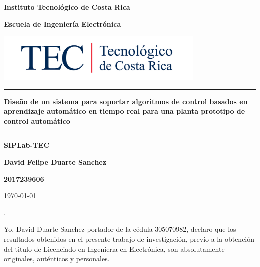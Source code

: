 \documentclass[12pt]{article}
\begin{document}
\begin{titlepage}

\centering


\vspace{10cm}

\textbf{\LARGE Instituto Tecnológico de Costa Rica}

\vspace{2cm}

\textbf{\LARGE Escuela de Ingeniería Electrónica}

\vspace{2cm}

\includegraphics[width=10cm]{logotec/image.png}
\vspace{2cm}

\hrule

\vspace{1cm}

\textbf{\LARGE Diseño de un sistema para soportar algoritmos de control basados en aprendizaje automático en tiempo real para una planta prototipo de control automático}

\vspace{1cm}

\hrule

\vspace{1cm}

\textbf{\LARGE SIPLab-TEC}

\vspace{1cm}

\textbf{\LARGE David Felipe Duarte Sanchez}

\vspace{1cm}

\textbf{\LARGE 2017239606}

\vspace{1cm}

\today %

\end{titlepage}
.
\par
\vspace{16cm} %

Yo, David Duarte Sanchez portador de la cédula 305070982, declaro que los resultados obtenidos en el presente trabajo de investigación, previo a la obtención del titulo de Licenciado en Ingenierıa en Electrónica, son absolutamente originales, auténticos y personales.
\end{document}
